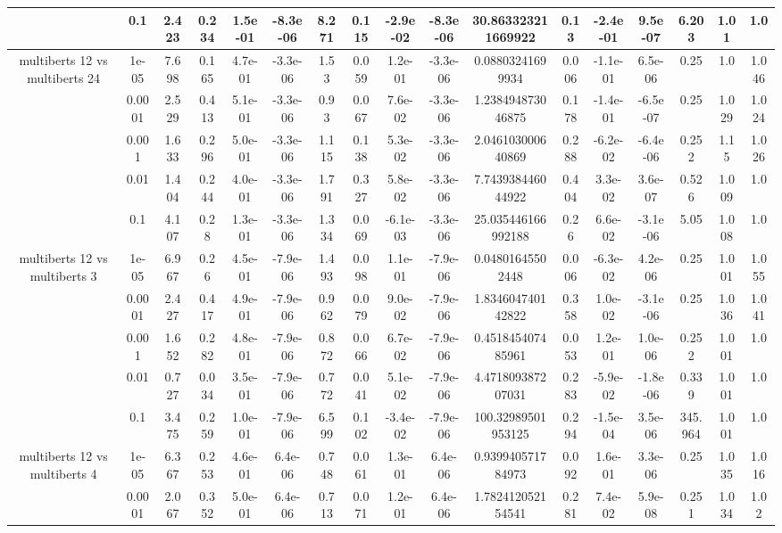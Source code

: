 \begin{tabular}{|c|c|c|c|c|c|c|c|c|c|c|c|c|c|c|c|c|}
 & 0.1 & 2.423 & 0.234 & 1.5e-01 & -8.3e-06 & 8.271 & 0.115 & -2.9e-02 & -8.3e-06 & 30.863323211669922 & 0.13 & -2.4e-01 & 9.5e-07 & 6.203 & 1.01 & 1.0 \\
\hline
\multirow{5}{*}{multiberts 12 vs multiberts 24} & 1e-05 & 7.698 & 0.165 & 4.7e-01 & -3.3e-06 & 1.53 & 0.059 & 1.2e-01 & -3.3e-06 & 0.08803241699934 & 0.006 & -1.1e-01 & 6.5e-06 & 0.25 & 1.0 & 1.046 \\
 & 0.0001 & 2.529 & 0.413 & 5.1e-01 & -3.3e-06 & 0.93 & 0.067 & 7.6e-02 & -3.3e-06 & 1.238494873046875 & 0.178 & -1.4e-01 & -6.5e-07 & 0.25 & 1.029 & 1.024 \\
 & 0.001 & 1.633 & 0.296 & 5.0e-01 & -3.3e-06 & 1.115 & 0.138 & 5.3e-02 & -3.3e-06 & 2.046103000640869 & 0.288 & -6.2e-02 & -6.4e-06 & 0.252 & 1.15 & 1.026 \\
 & 0.01 & 1.404 & 0.244 & 4.0e-01 & -3.3e-06 & 1.791 & 0.327 & 5.8e-02 & -3.3e-06 & 7.743938446044922 & 0.404 & 3.3e-02 & 3.6e-07 & 0.526 & 1.009 & 1.0 \\
 & 0.1 & 4.107 & 0.28 & 1.3e-01 & -3.3e-06 & 1.334 & 0.069 & -6.1e-03 & -3.3e-06 & 25.035446166992188 & 0.26 & 6.6e-02 & -3.1e-06 & 5.05 & 1.008 & 1.0 \\
\hline
\multirow{5}{*}{multiberts 12 vs multiberts 3} & 1e-05 & 6.967 & 0.26 & 4.5e-01 & -7.9e-06 & 1.493 & 0.098 & 1.1e-01 & -7.9e-06 & 0.04801645502448 & 0.006 & -6.3e-02 & 4.2e-06 & 0.25 & 1.001 & 1.055 \\
 & 0.0001 & 2.427 & 0.417 & 4.9e-01 & -7.9e-06 & 0.962 & 0.079 & 9.0e-02 & -7.9e-06 & 1.834604740142822 & 0.358 & 1.0e-02 & -3.1e-06 & 0.25 & 1.036 & 1.041 \\
 & 0.001 & 1.652 & 0.282 & 4.8e-01 & -7.9e-06 & 0.872 & 0.066 & 6.7e-02 & -7.9e-06 & 0.451845407485961 & 0.053 & 1.2e-01 & 1.0e-06 & 0.252 & 1.001 & 1.0 \\
 & 0.01 & 0.727 & 0.034 & 3.5e-01 & -7.9e-06 & 0.772 & 0.041 & 5.1e-02 & -7.9e-06 & 4.471809387207031 & 0.283 & -5.9e-02 & -1.8e-06 & 0.339 & 1.001 & 1.0 \\
 & 0.1 & 3.475 & 0.259 & 1.0e-01 & -7.9e-06 & 6.599 & 0.102 & -3.4e-02 & -7.9e-06 & 100.32989501953125 & 0.294 & -1.5e-04 & 3.5e-06 & 345.964 & 1.001 & 1.0 \\
\hline
\multirow{5}{*}{multiberts 12 vs multiberts 4} & 1e-05 & 6.367 & 0.253 & 4.6e-01 & 6.4e-06 & 0.748 & 0.061 & 1.3e-01 & 6.4e-06 & 0.939940571784973 & 0.092 & 1.6e-01 & 3.3e-06 & 0.25 & 1.035 & 1.016 \\
 & 0.0001 & 2.067 & 0.352 & 5.0e-01 & 6.4e-06 & 0.713 & 0.071 & 1.2e-01 & 6.4e-06 & 1.782412052154541 & 0.281 & 7.4e-02 & 5.9e-08 & 0.251 & 1.034 & 1.02 \\

\end{tabular}
